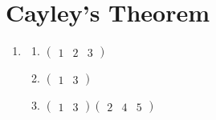 \section{Cayley's Theorem}
\begin{enumerate}
    \item \begin{enumerate}[label=(\alph*)]
        \item $\begin{pmatrix}1 & 2 & 3\end{pmatrix}$
        \item $\begin{pmatrix}1 & 3\end{pmatrix}$
        \item $\begin{pmatrix}1 & 3\end{pmatrix}\begin{pmatrix}2 & 4 & 5\end{pmatrix}$
    \end{enumerate}


\end{enumerate}
